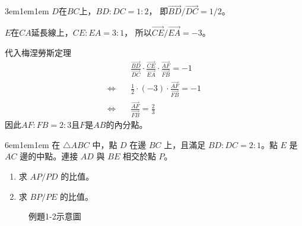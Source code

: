 \documentclass[12pt]{article}
\begin{document}
\begin{mybox}[解]{3em}{1em}{1em}
    $D$在$BC$上，$BD:DC=1:2$，
    即$\overrightarrow{BD}/\overrightarrow{DC}=1/2$。

    $E$在$CA$延長線上，$CE:EA=3:1$，
    所以$\overrightarrow{CE}/\overrightarrow{EA}=-3$。

    代入梅涅勞斯定理
    \begin{align*}
        &\frac{\overrightarrow{BD}}{\overrightarrow{DC}}
        \cdot\frac{\overrightarrow{CE}}{\overrightarrow{EA}}
        \cdot\frac{\overrightarrow{AF}}{\overrightarrow{FB}}=-1\\
        \Leftrightarrow\quad&\frac{1}{2}\cdot\left(-3\right)
        \cdot\frac{\overrightarrow{AF}}{\overrightarrow{FB}}=-1\\
        \Leftrightarrow\quad&\frac{\overrightarrow{AF}}{\overrightarrow{FB}}=\frac{2}{3}
    \end{align*}
    因此$AF:FB=2:3$且$F$是$AB$的內分點。
\end{mybox}
\newpage
\begin{mybox}[例題\thesection-2]{6em}{1em}{1em}
    在 $\triangle ABC$ 中，點 $D$ 在邊 $BC$ 上，且滿足 $BD:DC = 2:1$。點 $E$ 是 $AC$ 邊的中點。連接 $AD$ 與 $BE$ 相交於點 $P$。
    \begin{enumerate}[label=(\roman*)]
        \item 求 $AP/PD$ 的比值。
        \item 求 $BP/PE$ 的比值。
    \end{enumerate}
    \begin{figure}[H]
        \centering 
        \caption{例題1-2示意圖}
        \label{fig:coline_s1-4}
    \end{figure}
\end{mybox}
\end{document}
